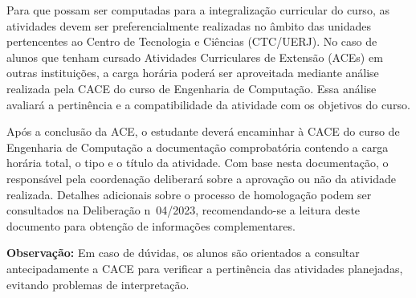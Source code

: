 Para que possam ser computadas para a integralização curricular do curso, as atividades devem ser preferencialmente realizadas no âmbito das unidades pertencentes ao Centro de Tecnologia e Ciências (CTC/UERJ). No caso de alunos que tenham cursado Atividades Curriculares de Extensão (ACEs) em outras instituições, a carga horária poderá ser aproveitada mediante análise realizada pela CACE do curso de Engenharia de Computação. Essa análise avaliará a pertinência e a compatibilidade da atividade com os objetivos do curso.

Após a conclusão da ACE, o estudante deverá encaminhar à CACE do curso de Engenharia de Computação a documentação comprobatória contendo a carga horária total, o tipo e o título da atividade. Com base nesta documentação, o responsável pela coordenação deliberará sobre a aprovação ou não da atividade realizada. Detalhes adicionais sobre o processo de homologação podem ser consultados na Deliberação n\textordmasculine~04/2023, recomendando-se a leitura deste documento para obtenção de informações complementares.

\textbf{Observação:} Em caso de dúvidas, os alunos são orientados a consultar antecipadamente a CACE para verificar a pertinência das atividades planejadas, evitando problemas de interpretação.
